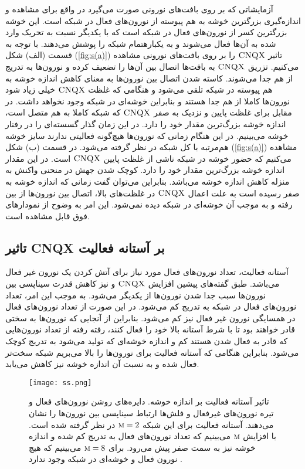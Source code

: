 آزمایشاتی که بر روی بافت‌های نورونی صورت می‌گیرد در واقع برای مشاهده و اندازه‌گیری بزرگترین خوشه به هم پیوسته از نورون‌های فعال در شبکه است. این خوشه بزرگترین کسر از نورون‌های فعال در شبکه است که با یکدیگر نسبت به تحریک وارد شده به آن‌ها فعال می‌شوند و به یکبارهتمام شبکه را پوشش می‌دهند. با توجه به قسمت (الف) شکل (\ref{fig:s(a)}) تاثیر   $\textsc{CNQX}$  را بر روی بافت‌های نورونی مشاهده می‌کنیم. تزریق   $\textsc{CNQX}$  به بافت‌ها اتصال بین آن‌ها را تضعیف کرده و نورون‌ها به تدریج از هم جدا می‌شوند. کاسته شدن اتصال بین نورون‌ها به معنای کاهش اندازه خوشه به هم پیوسته در شبکه تلقی می‌شود و هنگامی که غلظت   $\textsc{CNQX}$  خیلی زیاد شود نورون‌ها کاملا از هم جدا هستند و بنابراین خوشه‌ای در شبکه وجود نخواهد داشت. در مقابل برای غلظت پایین و نزدیک به صفر   $\textsc{CNQX}$   که شبکه کاملا به هم متصل است، اندازه خوشه بزرگ‌ترین مقدار خود را دارد. در این زمان گذار گسسته‌ای را در رفنار خوشه می‌بینیم. در این هنگام زمانی که نورون‌ها هیچ‌گونه فعالیتی ندارند سایز خوشه هم‌مرتبه با کل شبکه در نظر گرفته می‌شود. در قسمت  (ب) شکل (\ref{fig:s(a)})  مشاهده می‌کنیم که حضور خوشه در شبکه ناشی از غلظت پایین   $\textsc{CNQX}$  است. در این مقدار اندازه خوشه بزرگ‌ترین مقدار خود را دارد. کوچک شدن جهش در منحنی واکنش به منزله کاهش اندازه خوشه می‌باشد. بنابراین می‌توان گفت زمانی که اندازه خوشه به صفر رسیده است به علت اعمال   $\textsc{CNQX}$  در غلظت‌های بالا، اتصال‌ بین نورون‌ها از بین رفته و به موجب آن خوشه‌ای در شبکه دیده نمی‌شود. این امر به وضوح از نمودار‌های فوق قابل مشاهده است.


\subsection{تاثیر \textsc{CNQX} بر آستانه فعالیت}
آستانه فعالیت، تعداد نورون‌های فعال مورد نیاز برای آتش کردن یک نورون غیر فعال می‌باشد. طبق گفته‌های پیشین افزایش   $\textsc{CNQX}$  و نیز کاهش قدرت سیناپسی بین نورون‌ها سبب جدا شدن نورون‌ها از یکدیگر می‌شود. به موجب این امر، تعداد نورون‌های فعال در شبکه به تدریج کم می‌شود. در این صورت از تعداد نورون‌های فعال در همسایگی نورون غیر فعال نیز کم می‌شود. بنابراین از آنجایی که نورون‌ها به سختی قادر خواهند بود تا با شرط آستانه بالا خود را فعال کنند، رفته رفته از تعداد نورون‌هایی که قادر به فعال شدن هستند کم و اندازه خوشه‌ای که تولید می‌شود به تدریج کوچک می‌شود. بنابراین هنگامی که آستانه فعالیت برای نورون‌ها را بالا می‌بریم شبکه سخت‌تر فعال شده و به نسبت آن اندازه خوشه نیز کاهش می‌یابد.
 \begin{figure} [htbp]
\centering
\texttt{[image: ss.png]} 
\caption[تاثیر آستانه فعالیت بر اندازه خوشه] {\vspace{-0.01}\footnotesize تاثیر آستانه فعالیت بر اندازه خوشه. دایره‌های روشن نورون‌های فعال و تیره نورون‌های غیرفعال و فلش‌ها ارتباط سیناپسی بین نورون‌ها را نشان می‌دهند. آستانه فعالیت برای این شبکه
 $\textsc{m} = 2$
  در نظر گرفته شده است.  با افزایش
   $\textsc{m}$
    می‌بینیم که تعداد نورون‌های فعال به تدریج کم شده و اندازه خوشه نیز به سمت صفر پیش می‌رود. برای 
    $\textsc{m} = 8$
     می‌بینیم که هیچ نورون فعال و خوشه‌ای در شبکه وجود ندارد \cite{cohen}.}
\label{fig:ss}
\end{figure}


